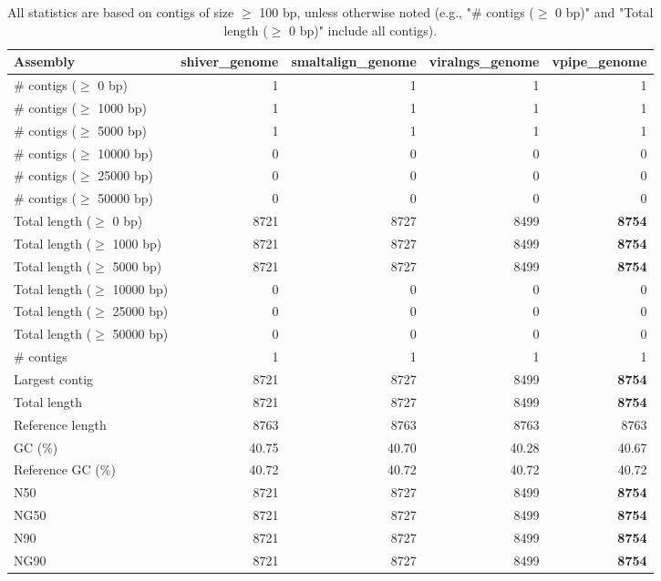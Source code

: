 \documentclass[12pt,a4paper]{article}
\begin{document}
\begin{table}[ht]
\begin{center}
\caption{All statistics are based on contigs of size $\geq$ 100 bp, unless otherwise noted (e.g., "\# contigs ($\geq$ 0 bp)" and "Total length ($\geq$ 0 bp)" include all contigs).}
\begin{tabular}{|l*{4}{|r}|}
\hline
Assembly & shiver\_genome & smaltalign\_genome & viralngs\_genome & vpipe\_genome \\ \hline
\# contigs ($\geq$ 0 bp) & 1 & 1 & 1 & 1 \\ \hline
\# contigs ($\geq$ 1000 bp) & 1 & 1 & 1 & 1 \\ \hline
\# contigs ($\geq$ 5000 bp) & 1 & 1 & 1 & 1 \\ \hline
\# contigs ($\geq$ 10000 bp) & 0 & 0 & 0 & 0 \\ \hline
\# contigs ($\geq$ 25000 bp) & 0 & 0 & 0 & 0 \\ \hline
\# contigs ($\geq$ 50000 bp) & 0 & 0 & 0 & 0 \\ \hline
Total length ($\geq$ 0 bp) & 8721 & 8727 & 8499 & {\bf 8754} \\ \hline
Total length ($\geq$ 1000 bp) & 8721 & 8727 & 8499 & {\bf 8754} \\ \hline
Total length ($\geq$ 5000 bp) & 8721 & 8727 & 8499 & {\bf 8754} \\ \hline
Total length ($\geq$ 10000 bp) & 0 & 0 & 0 & 0 \\ \hline
Total length ($\geq$ 25000 bp) & 0 & 0 & 0 & 0 \\ \hline
Total length ($\geq$ 50000 bp) & 0 & 0 & 0 & 0 \\ \hline
\# contigs & 1 & 1 & 1 & 1 \\ \hline
Largest contig & 8721 & 8727 & 8499 & {\bf 8754} \\ \hline
Total length & 8721 & 8727 & 8499 & {\bf 8754} \\ \hline
Reference length & 8763 & 8763 & 8763 & 8763 \\ \hline
GC (\%) & 40.75 & 40.70 & 40.28 & 40.67 \\ \hline
Reference GC (\%) & 40.72 & 40.72 & 40.72 & 40.72 \\ \hline
N50 & 8721 & 8727 & 8499 & {\bf 8754} \\ \hline
NG50 & 8721 & 8727 & 8499 & {\bf 8754} \\ \hline
N90 & 8721 & 8727 & 8499 & {\bf 8754} \\ \hline
NG90 & 8721 & 8727 & 8499 & {\bf 8754} \\ \hline

\end{tabular}
\end{center}
\end{table}
\end{document}
